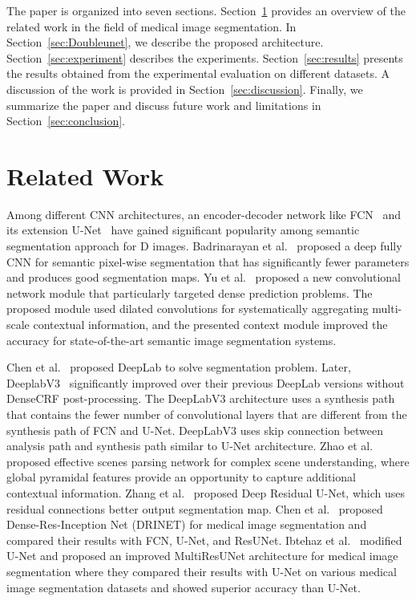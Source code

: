 \documentclass[conference]{IEEEtran}
\begin{document}
The paper is organized into seven sections. Section~\ref{sec:related} provides an overview of the related work in the field of medical image segmentation. In Section~\ref{sec:Doubleunet}, we describe the proposed architecture. Section~\ref{sec:experiment} describes the experiments. Section~\ref{sec:results} presents the results obtained from the experimental evaluation on different datasets. A discussion of the work is provided in Section~\ref{sec:discussion}. Finally, we summarize the paper and discuss future work and limitations in Section~\ref{sec:conclusion}.
\section{Related Work}
\label{sec:related}

Among different \ac{CNN} architectures, an encoder-decoder network like \ac{FCN}~\cite{long2015fully} and its extension U-Net~\cite{ronneberger2015u} have gained significant popularity among semantic segmentation approach for D images. Badrinarayan et al.~\cite{badrinarayanan2017segnet} proposed a deep fully \ac{CNN} for semantic pixel-wise segmentation that has significantly fewer parameters and produces good segmentation maps. Yu et al.~\cite{yu2015multi} proposed a new convolutional network module that particularly targeted dense prediction problems. The proposed module used dilated convolutions for systematically aggregating multi-scale contextual information, and the presented context module improved the accuracy for state-of-the-art semantic image segmentation systems. 

Chen et al.~\cite{chen2017deeplab} proposed DeepLab to solve segmentation problem. Later, DeeplabV3~\cite{chen2017rethinking} significantly improved over their previous DeepLab versions without DenseCRF post-processing. The DeepLabV3 architecture uses a synthesis path that contains the fewer number of convolutional layers that are different from the synthesis path of \ac{FCN} and U-Net. DeepLabV3 uses skip connection between analysis path and synthesis path similar to U-Net architecture. Zhao et al.~\cite{zhao2017pyramid} proposed effective scenes parsing network for complex scene understanding, where global pyramidal features provide an opportunity to capture additional contextual information. Zhang et al.~\cite{zhang2018road} proposed Deep Residual U-Net, which uses residual connections better output segmentation map.
Chen et al.~\cite{chen2018drinet} proposed Dense-Res-Inception Net (DRINET) for medical image segmentation and compared their results with FCN, U-Net, and ResUNet. Ibtehaz et al.~\cite{ibtehaz2020multiresunet} modified U-Net and proposed an improved MultiResUNet architecture for medical image segmentation where they compared their results with U-Net on various medical image segmentation datasets and showed superior accuracy than U-Net. 
\end{document}
